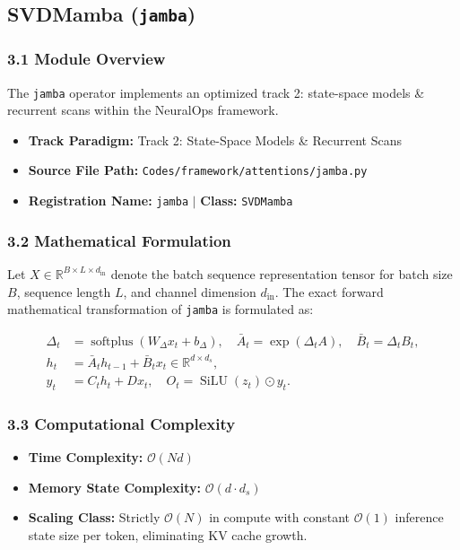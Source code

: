 \subsection{SVDMamba (\texttt{jamba})}
\label{sec:app_module_jamba}

\subsubsection*{3.1 Module Overview}
The \texttt{jamba} operator implements an optimized track 2: state-space models \& recurrent scans within the NeuralOps framework.
\begin{itemize}
    \item \textbf{Track Paradigm:} Track 2: State-Space Models & Recurrent Scans
    \item \textbf{Source File Path:} \texttt{Codes/framework/attentions/jamba.py}
    \item \textbf{Registration Name:} \texttt{jamba} $\mid$ \textbf{Class:} \texttt{SVDMamba}
\end{itemize}

\subsubsection*{3.2 Mathematical Formulation}
Let $X \in \mathbb{R}^{B \times L \times d_{\text{in}}}$ denote the batch sequence representation tensor for batch size $B$, sequence length $L$, and channel dimension $d_{\text{in}}$. The exact forward mathematical transformation of \texttt{jamba} is formulated as:

\begin{align}
\Delta_t &= \operatorname{softplus}(W_\Delta x_t + b_\Delta), \quad \bar{A}_t = \exp(\Delta_t A), \quad \bar{B}_t = \Delta_t B_t, \\
h_t &= \bar{A}_t h_{t-1} + \bar{B}_t x_t \in \mathbb{R}^{d \times d_s}, \\
y_t &= C_t h_t + D x_t, \quad O_t = \operatorname{SiLU}(z_t) \odot y_t.
\end{align}


\subsubsection*{3.3 Computational Complexity}
\begin{itemize}
    \item \textbf{Time Complexity:} $\mathcal{O}(N d)$
    \item \textbf{Memory State Complexity:} $\mathcal{O}(d \cdot d_s)$
    \item \textbf{Scaling Class:} Strictly $\mathcal{O}(N)$ in compute with constant $\mathcal{O}(1)$ inference state size per token, eliminating KV cache growth.
\end{itemize}

